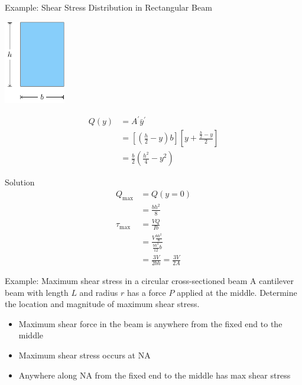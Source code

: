 \documentclass[10pt, svgnames]{beamer}
\begin{document}
\begin{frame}[label={sec:org8ad4cdc}]{Example: Shear Stress Distribution in Rectangular Beam}
\begin{center}
\includegraphics[width=0.2\textwidth]{pictures/shear-stress-example.pdf}
\end{center}

\begin{align*}
  Q(y) &= A^{\prime}\bar{y}^{\prime} \\
       &= \left[ \left( \frac{h}{2} - y \right) b \right] \left[y + \frac{\frac{h}{2} - y}{2} \right] \\
       &= \frac{b}{2} \left( \frac{h^{2}}{4} - y^{2} \right)
\end{align*}
\end{frame}

\begin{frame}[label={sec:org10d755c}]{Solution}
\begin{align*}
  Q_{\max} &= Q(y = 0) \\
           &= \frac{bh^{2}}{8} \\
  \tau_{\max} &= \frac{VQ}{Ib} \\
           &= \frac{V \frac{bh^{2}}{8}}{ \frac{bh^{3}}{12} b} \\
           &= \frac{3V}{2bh}  = \frac{3V}{2A}
\end{align*}
\end{frame}

\begin{frame}[label={sec:org9c3421e}]{Example: Maximum shear stress in a circular cross-sectioned beam}
A cantilever beam with length \(L\) and radius \(r\) has a force \(P\)
applied at the middle. Determine the location and magnitude of maximum
shear stress.

\begin{itemize}
\item Maximum shear force in the beam is anywhere from the fixed end to the
middle

\item Maximum shear stress occurs at NA

\item Anywhere along NA from the fixed end to the middle has max shear
stress
\end{itemize}
\end{frame}
\end{document}
